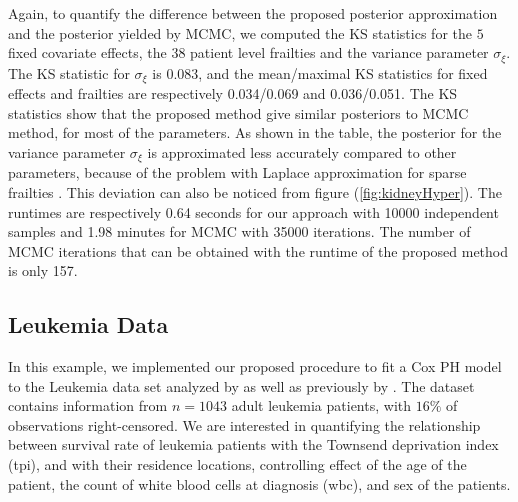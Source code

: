 \documentclass[ba]{imsart}
\begin{document}
Again, to quantify the difference between the proposed posterior approximation and the posterior yielded by MCMC, we computed the KS statistics for the $5$ fixed covariate effects, the $38$ patient level frailties and the variance parameter $\sigma_\xi$. The KS statistic for $\sigma_\xi$ is 0.083, and the mean/maximal KS statistics for fixed effects and frailties are respectively 0.034/0.069 and 0.036/0.051. The KS statistics show that the proposed method give similar posteriors to MCMC method, for most of the parameters. As shown in the table, the posterior for the variance parameter $\sigma_\xi$ is approximated less accurately compared to other parameters, because of the problem with Laplace approximation for sparse frailties \citep{Ogden2013ASR}. This deviation can also be noticed from figure (\ref{fig:kidneyHyper}). The runtimes are respectively 0.64 seconds for our approach with 10000 independent samples and 1.98 minutes for MCMC with 35000 iterations. The number of MCMC iterations that can be obtained with the runtime of the proposed method is only 157.


\subsection{Leukemia Data}\label{subsec:leuk}

In this example, we implemented our proposed procedure to fit a Cox PH model to the Leukemia data set analyzed by \cite{inlacoxph} as well as previously by \cite{spde,leukaemia}. The dataset contains information from $n=1043$ adult leukemia patients, with $16\%$ of observations right-censored. We are interested in quantifying the relationship between survival rate of leukemia patients with the Townsend deprivation index (tpi), and with their residence locations, controlling effect of the age of the patient, the count of white blood cells at diagnosis (wbc), and sex of the patients.
\end{document}
